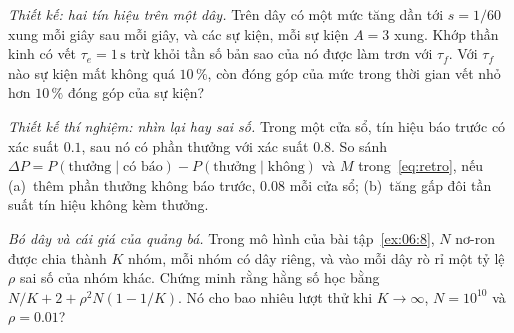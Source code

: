 \begin{exercise}[\lvlB]
\label{ex:07:6}
\emph{Thiết kế: hai tín hiệu trên một dây.} Trên dây  có một mức tăng dần tới $s=1/60$ xung mỗi giây sau mỗi giây, và các sự kiện, mỗi sự kiện $A=3$ xung. Khớp thần kinh có vết $\tau_e=1\,\text{s}$ trừ khỏi tần số bản sao của nó được làm trơn với $\tau_f$. Với $\tau_f$ nào sự kiện mất không quá $10\,\%$, còn đóng góp của mức trong thời gian vết nhỏ hơn $10\,\%$ đóng góp của sự kiện?
\end{exercise}

\begin{exercise}[\lvlB]
\label{ex:07:7}
\emph{Thiết kế thí nghiệm: nhìn lại hay sai số.} Trong một cửa sổ, tín hiệu báo trước có xác suất $0.1$, sau nó có phần thưởng với xác suất $0.8$. So sánh $\Delta P=P(\text{thưởng}\mid\text{có báo})-P(\text{thưởng}\mid\text{không})$ và $M$ trong~\eqref{eq:retro}, nếu (a)~thêm phần thưởng không báo trước, $0.08$ mỗi cửa sổ; (b)~tăng gấp đôi tần suất tín hiệu không kèm thưởng.
\end{exercise}

\begin{exercise}[\lvlC]
\label{ex:07:8}
\emph{Bó dây và cái giá của quảng bá.} Trong mô hình của bài tập~\ref{ex:06:8}, $N$ nơ-ron được chia thành $K$ nhóm, mỗi nhóm có dây riêng, và vào mỗi dây rò rỉ một tỷ lệ $\rho$ sai số của nhóm khác. Chứng minh rằng hằng số học bằng $N/K+2+\rho^2N(1-1/K)$. Nó cho bao nhiêu lượt thử khi $K\to\infty$, $N=10^{10}$ và $\rho=0.01$?
\end{exercise}
